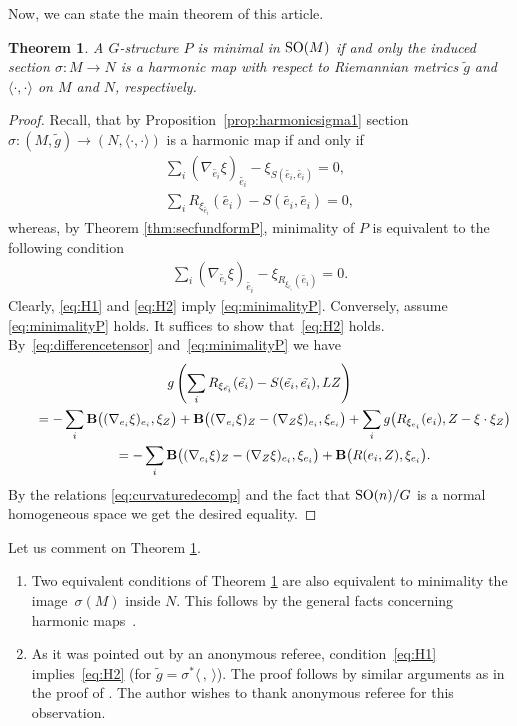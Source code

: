 \documentclass[pdftex]{sigma}
\numberwithin{equation}{section}
\newtheorem{Theorem}{Theorem}[section]
\newcommand{\skal}[2]{\langle #1,#2\rangle}
\begin{document}
Now, we can state the main theorem of this article.

\begin{Theorem}\label{thm:minimalityofP}
A $G$-structure $P$ is minimal in ${\rm SO}(M)$ if and only the induced section \mbox{$\sigma\colon M{\to} N$} is a harmonic map with respect to Riemannian metrics $\tilde{g}$ and $\skal{\cdot}{\cdot}$ on $M$ and $N$, respectively.
\end{Theorem}
\begin{proof}
Recall, that by Proposition~\ref{prop:harmonicsigma1} section $\sigma\colon (M,\tilde{g})\to (N,\skal{\cdot}{\cdot})$ is a harmonic map if and only if
\begin{gather}
\sum_i(\nabla_{\tilde{e_i}}\xi)_{\tilde{e_i}}-\xi_{S(\tilde{e_i},\tilde{e_i})}=0,\label{eq:H1}\\ %
\sum_i R_{\xi_{\tilde{e_i}}}(\tilde{e_i})-S(\tilde{e_i},\tilde{e_i})=0,\label{eq:H2} %
\end{gather}
whereas, by Theorem \ref{thm:secfundformP}, minimality of $P$ is equivalent to the following condition
\begin{gather}\label{eq:minimalityP}%
\sum_i (\nabla_{\tilde{e_i}}\xi)_{\tilde{e_i}}-\xi_{R_{\xi_{\tilde{e_i}}}(\tilde{e_i})}=0.
\end{gather}
Clearly, \eqref{eq:H1} and \eqref{eq:H2} imply \eqref{eq:minimalityP}. Conversely, assume \eqref{eq:minimalityP} holds. It suf\/f\/ices to show that~\eqref{eq:H2} holds. By~\eqref{eq:differencetensor} and~\eqref{eq:minimalityP} we have
\begin{gather*}
g\left( \sum_i R_{\xi_{\tilde{e_i}}}(\tilde{e_i})-S(\tilde{e_i},\tilde{e_i}),LZ\right)\\
\qquad{}=-\sum_i{\bf B}\big((\nabla_{e_i}\xi)_{e_i},\xi_Z\big)
+{\bf B}\big((\nabla_{e_i}\xi)_Z-(\nabla_Z\xi)_{e_i},\xi_{e_i}\big) +\sum_i g\big(R_{\xi_{e_i}}(e_i),Z-\xi\cdot \xi_Z\big)\\
\qquad{} =-\sum_i{\bf B}\big((\nabla_{e_i}\xi)_Z-(\nabla_Z\xi)_{e_i},\xi_{e_i}\big)+{\bf B}\big(R(e_i,Z),\xi_{e_i}\big).
\end{gather*}
By the relations \eqref{eq:curvaturedecomp} and the fact that ${\rm SO}(n)/G$ is a normal homogeneous space we get the desired equality.
\end{proof}

\begin{Remark}\label{rem:H1impliesH2}
Let us comment on Theorem \ref{thm:minimalityofP}.
\begin{enumerate}\itemsep=0pt
\item Two equivalent conditions of Theorem \ref{thm:minimalityofP} are also equivalent to minimality the ima\-ge~$\sigma(M)$ inside $N$. This follows by the general facts concerning harmonic maps~\cite{el}.
\item As it was pointed out by an anonymous referee, condition~\eqref{eq:H1} implies~\eqref{eq:H2} (for $\tilde{g}=\sigma^{\ast}\skal{\,}{\,}$). The proof follows by similar arguments as in the proof of \cite[Proposition~2.5]{ggv}. The author wishes to thank anonymous referee for this observation.
\end{enumerate}
\end{Remark}
\end{document}

